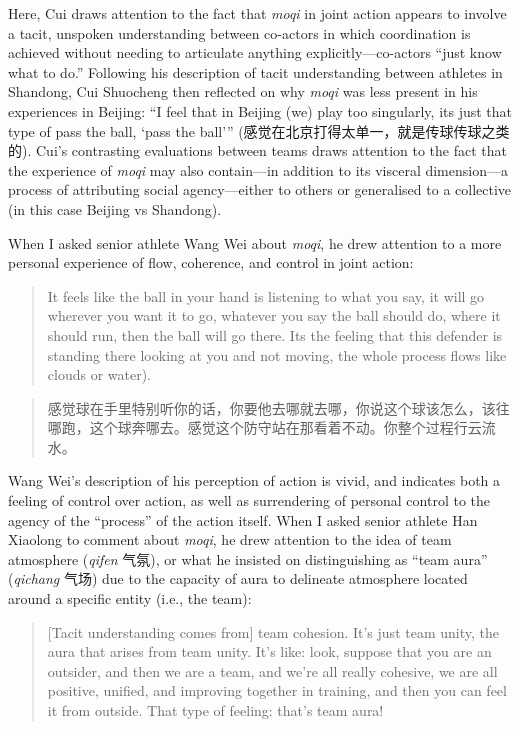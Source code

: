 \begin{CJK}{UTF8}{gbsn}
Here, Cui draws attention to the fact that \textit{moqi} in joint action appears to involve a tacit, unspoken understanding between co-actors in which coordination is achieved without needing to articulate anything explicitly---co-actors ``just know what to do.''   Following his description of tacit understanding between athletes in Shandong, Cui Shuocheng then reflected on why \textit{moqi} was less present in his experiences in Beijing: ``I feel that in Beijing (we) play too singularly, its just that type of pass the ball, `pass the ball'''  (感觉在北京打得太单一，就是传球传球之类的).  Cui's contrasting evaluations  between teams draws attention to the fact that the experience of \textit{moqi} may also contain---in addition to its visceral dimension---a process of attributing social agency---either to others or generalised to a collective (in this case Beijing vs Shandong).

When I asked senior athlete Wang Wei about \textit{moqi}, he drew attention to a more personal experience of flow, coherence, and control in joint action:

  \begin{quote}
    It feels like the ball in your hand is listening to what you say, it will go wherever you want it to go, whatever you say the ball should do, where it should run, then the ball will go there.  Its the feeling that this defender is standing there looking at you and not moving, the whole process flows like clouds or water).
  \end{quote}

  \begin{quote}
        感觉球在手里特别听你的话，你要他去哪就去哪，你说这个球该怎么，该往哪跑，这个球奔哪去。感觉这个防守站在那看着不动。你整个过程行云流水。
  \end{quote}

Wang Wei's description of his perception of action is vivid, and indicates both a feeling of control over action, as well as surrendering of personal control to the agency of the ``process'' of the action itself.  When I asked senior athlete Han Xiaolong to comment about \textit{moqi}, he drew attention to the idea of team atmosphere (\textit{qifen} 气氛), or what he insisted on distinguishing as ``team aura'' (\textit{qichang} 气场) due to the capacity of aura to delineate atmosphere located around a specific entity (i.e., the team):

    \begin{quote}
      [Tacit understanding comes from] team cohesion.  It's just team unity, the aura that arises from team unity.  It's like: look, suppose that you are an outsider, and then we are a team, and we're all really cohesive, we are all positive, unified, and improving together in training, and then you can feel it from outside.  That type of feeling: that's team aura!
    \end{quote}


\end{CJK}
